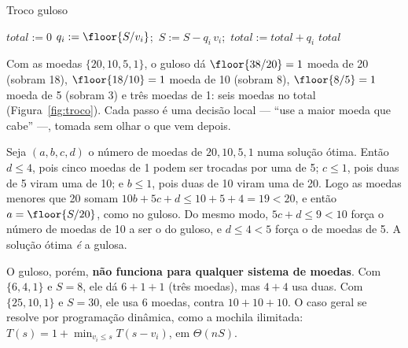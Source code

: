 \begin{pseudo}{Troco guloso}
\begin{algorithmic}
 
  \State $total:=0$
    \State $q_i:=\floor{S/v_i}$;\ $S:=S-q_i\,v_i$;\ $total:=total+q_i$ 
  \EndFor
  \State \Return $total$ 
\EndFunction
\end{algorithmic}
\end{pseudo}

\begin{exemplo}\label{ex:troco38}
Com as moedas $\{20,10,5,1\}$, o guloso dá $\floor{38/20}=1$ moeda de 20 (sobram 18), $\floor{18/10}=1$ moeda de 10 (sobram 8), $\floor{8/5}=1$ moeda de 5 (sobram 3) e três moedas de 1: seis moedas no total (Figura~\ref{fig:troco}). Cada passo é uma decisão local --- ``use a maior moeda que cabe'' ---, tomada sem olhar o que vem depois.
\begin{figura}
\end{figura}
\end{exemplo}

\begin{exemplo}\label{ex:trocootimo}
Seja $(a,b,c,d)$ o número de moedas de $20,10,5,1$ numa solução ótima. Então $d\le4$, pois cinco moedas de 1 podem ser trocadas por uma de 5; $c\le1$, pois duas de 5 viram uma de 10; e $b\le1$, pois duas de 10 viram uma de 20. Logo as moedas menores que 20 somam $10b+5c+d\le10+5+4=19<20$, e então $a=\floor{S/20}$, como no guloso. Do mesmo modo, $5c+d\le9<10$ força o número de moedas de 10 a ser o do guloso, e $d\le4<5$ força o de moedas de 5. A solução ótima \emph{é} a gulosa.
\end{exemplo}
O guloso, porém, \textbf{não funciona para qualquer sistema de moedas}. Com $\{6,4,1\}$ e $S=8$, ele dá $6+1+1$ (três moedas), mas $4+4$ usa duas. Com $\{25,10,1\}$ e $S=30$, ele usa 6 moedas, contra $10+10+10$. O caso geral se resolve por programação dinâmica, como a mochila ilimitada: $T(s)=1+\min_{v_i\le s}T(s-v_i)$, em $\Theta(nS)$.

